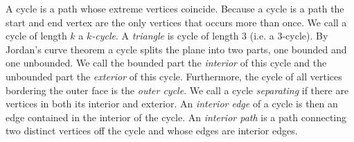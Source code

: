   A cycle is a path whose extreme vertices coincide. Because a cycle is a path the start and end vertex are the only vertices that occurs more than once. We call a cycle of length $k$  a \emph{$k$-cycle}. A \emph{triangle} is cycle of length $3$ (i.e. a $3$-cycle). By Jordan's curve theorem a cycle splits the plane into two parts, one bounded and one unbounded. We call the bounded part the \emph{interior} of this cycle and the unbounded part the \emph{exterior} of this cycle.
  Furthermore, the cycle of all vertices bordering the outer face is the \emph{outer cycle}.
  We call a cycle \emph{separating} if there are vertices in both its interior and exterior.
  An \emph{interior edge} of a cycle is then an edge contained in the interior of the cycle.
  An \emph{interior path} is a path connecting two distinct vertices off the cycle and whose edges are interior edges.
